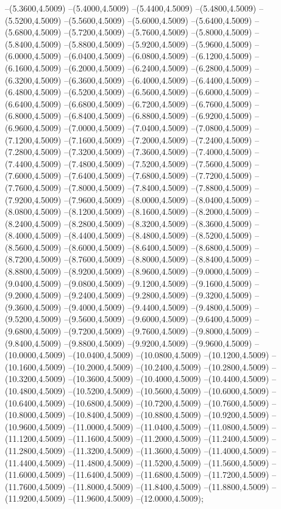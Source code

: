 {	--(5.3600,4.5009)
	--(5.4000,4.5009)
	--(5.4400,4.5009)
	--(5.4800,4.5009)
	--(5.5200,4.5009)
	--(5.5600,4.5009)
	--(5.6000,4.5009)
	--(5.6400,4.5009)
	--(5.6800,4.5009)
	--(5.7200,4.5009)
	--(5.7600,4.5009)
	--(5.8000,4.5009)
	--(5.8400,4.5009)
	--(5.8800,4.5009)
	--(5.9200,4.5009)
	--(5.9600,4.5009)
	--(6.0000,4.5009)
	--(6.0400,4.5009)
	--(6.0800,4.5009)
	--(6.1200,4.5009)
	--(6.1600,4.5009)
	--(6.2000,4.5009)
	--(6.2400,4.5009)
	--(6.2800,4.5009)
	--(6.3200,4.5009)
	--(6.3600,4.5009)
	--(6.4000,4.5009)
	--(6.4400,4.5009)
	--(6.4800,4.5009)
	--(6.5200,4.5009)
	--(6.5600,4.5009)
	--(6.6000,4.5009)
	--(6.6400,4.5009)
	--(6.6800,4.5009)
	--(6.7200,4.5009)
	--(6.7600,4.5009)
	--(6.8000,4.5009)
	--(6.8400,4.5009)
	--(6.8800,4.5009)
	--(6.9200,4.5009)
	--(6.9600,4.5009)
	--(7.0000,4.5009)
	--(7.0400,4.5009)
	--(7.0800,4.5009)
	--(7.1200,4.5009)
	--(7.1600,4.5009)
	--(7.2000,4.5009)
	--(7.2400,4.5009)
	--(7.2800,4.5009)
	--(7.3200,4.5009)
	--(7.3600,4.5009)
	--(7.4000,4.5009)
	--(7.4400,4.5009)
	--(7.4800,4.5009)
	--(7.5200,4.5009)
	--(7.5600,4.5009)
	--(7.6000,4.5009)
	--(7.6400,4.5009)
	--(7.6800,4.5009)
	--(7.7200,4.5009)
	--(7.7600,4.5009)
	--(7.8000,4.5009)
	--(7.8400,4.5009)
	--(7.8800,4.5009)
	--(7.9200,4.5009)
	--(7.9600,4.5009)
	--(8.0000,4.5009)
	--(8.0400,4.5009)
	--(8.0800,4.5009)
	--(8.1200,4.5009)
	--(8.1600,4.5009)
	--(8.2000,4.5009)
	--(8.2400,4.5009)
	--(8.2800,4.5009)
	--(8.3200,4.5009)
	--(8.3600,4.5009)
	--(8.4000,4.5009)
	--(8.4400,4.5009)
	--(8.4800,4.5009)
	--(8.5200,4.5009)
	--(8.5600,4.5009)
	--(8.6000,4.5009)
	--(8.6400,4.5009)
	--(8.6800,4.5009)
	--(8.7200,4.5009)
	--(8.7600,4.5009)
	--(8.8000,4.5009)
	--(8.8400,4.5009)
	--(8.8800,4.5009)
	--(8.9200,4.5009)
	--(8.9600,4.5009)
	--(9.0000,4.5009)
	--(9.0400,4.5009)
	--(9.0800,4.5009)
	--(9.1200,4.5009)
	--(9.1600,4.5009)
	--(9.2000,4.5009)
	--(9.2400,4.5009)
	--(9.2800,4.5009)
	--(9.3200,4.5009)
	--(9.3600,4.5009)
	--(9.4000,4.5009)
	--(9.4400,4.5009)
	--(9.4800,4.5009)
	--(9.5200,4.5009)
	--(9.5600,4.5009)
	--(9.6000,4.5009)
	--(9.6400,4.5009)
	--(9.6800,4.5009)
	--(9.7200,4.5009)
	--(9.7600,4.5009)
	--(9.8000,4.5009)
	--(9.8400,4.5009)
	--(9.8800,4.5009)
	--(9.9200,4.5009)
	--(9.9600,4.5009)
	--(10.0000,4.5009)
	--(10.0400,4.5009)
	--(10.0800,4.5009)
	--(10.1200,4.5009)
	--(10.1600,4.5009)
	--(10.2000,4.5009)
	--(10.2400,4.5009)
	--(10.2800,4.5009)
	--(10.3200,4.5009)
	--(10.3600,4.5009)
	--(10.4000,4.5009)
	--(10.4400,4.5009)
	--(10.4800,4.5009)
	--(10.5200,4.5009)
	--(10.5600,4.5009)
	--(10.6000,4.5009)
	--(10.6400,4.5009)
	--(10.6800,4.5009)
	--(10.7200,4.5009)
	--(10.7600,4.5009)
	--(10.8000,4.5009)
	--(10.8400,4.5009)
	--(10.8800,4.5009)
	--(10.9200,4.5009)
	--(10.9600,4.5009)
	--(11.0000,4.5009)
	--(11.0400,4.5009)
	--(11.0800,4.5009)
	--(11.1200,4.5009)
	--(11.1600,4.5009)
	--(11.2000,4.5009)
	--(11.2400,4.5009)
	--(11.2800,4.5009)
	--(11.3200,4.5009)
	--(11.3600,4.5009)
	--(11.4000,4.5009)
	--(11.4400,4.5009)
	--(11.4800,4.5009)
	--(11.5200,4.5009)
	--(11.5600,4.5009)
	--(11.6000,4.5009)
	--(11.6400,4.5009)
	--(11.6800,4.5009)
	--(11.7200,4.5009)
	--(11.7600,4.5009)
	--(11.8000,4.5009)
	--(11.8400,4.5009)
	--(11.8800,4.5009)
	--(11.9200,4.5009)
	--(11.9600,4.5009)
	--(12.0000,4.5009);
}
